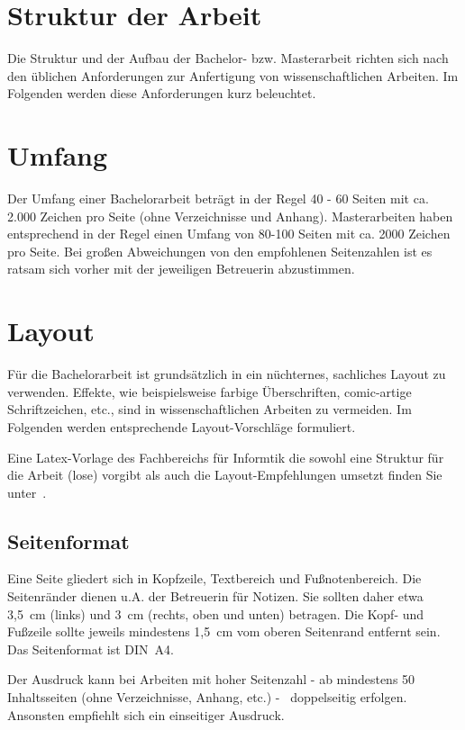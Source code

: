 \section{Struktur der Arbeit}\label{sec:structure}
%
Die Struktur und der Aufbau der Bachelor- bzw. Masterarbeit richten sich nach den üblichen Anforderungen zur Anfertigung von wissenschaftlichen Arbeiten. Im Folgenden werden diese Anforderungen kurz beleuchtet.

\section{Umfang}\label{sec:structure:scope}
%
Der Umfang einer Bachelorarbeit beträgt in der Regel 40 - 60 Seiten mit ca. 2.000 Zeichen pro Seite (ohne Verzeichnisse und Anhang). Masterarbeiten haben entsprechend in der Regel einen Umfang von 80-100 Seiten mit ca. 2000 Zeichen pro Seite. Bei großen Abweichungen von den empfohlenen Seitenzahlen ist es ratsam sich vorher mit der jeweiligen Betreuerin abzustimmen.

\section{Layout}\label{sec:structure:layout}
%
Für die Bachelorarbeit ist grundsätzlich in ein nüchternes, sachliches Layout zu verwenden. Effekte, wie beispielsweise farbige Überschriften, comic-artige Schriftzeichen, etc., sind in wissenschaftlichen Arbeiten zu vermeiden. Im Folgenden werden entsprechende Layout-Vorschläge formuliert.

Eine Latex-Vorlage des Fachbereichs für Informtik die sowohl eine Struktur für die Arbeit (lose) vorgibt als auch die Layout-Empfehlungen umsetzt finden Sie unter~\cite{mbredel:2020:01}.

\subsection{Seitenformat}\label{sec:structure:layout:format}
%
Eine Seite gliedert sich in Kopfzeile, Textbereich und Fußnotenbereich. Die Seitenränder dienen u.A. der Betreuerin für Notizen. Sie sollten daher etwa 3,5~cm (links) und 3~cm (rechts, oben und unten) betragen. Die Kopf- und Fußzeile sollte jeweils mindestens 1,5~cm vom oberen Seitenrand entfernt sein. Das Seitenformat ist DIN~A4.
\smallskip

Der Ausdruck kann bei Arbeiten mit hoher Seitenzahl - ab mindestens 50 Inhaltsseiten (ohne Verzeichnisse, Anhang, etc.) -  doppelseitig erfolgen. Ansonsten empfiehlt sich ein einseitiger Ausdruck.

